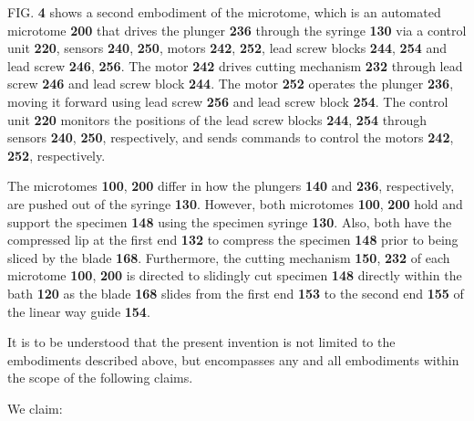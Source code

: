 \documentclass{article}
\begin{document}
FIG. \textbf{4} shows a second embodiment of the microtome, which is an automated microtome \textbf{200} that drives the plunger \textbf{236} through the syringe \textbf{130} via a control unit \textbf{220}, sensors \textbf{240}, \textbf{250}, motors \textbf{242}, \textbf{252}, lead screw blocks \textbf{244}, \textbf{254} and lead screw \textbf{246}, \textbf{256}. The motor \textbf{242} drives cutting mechanism \textbf{232} through lead screw \textbf{246} and lead screw block \textbf{244}. The motor \textbf{252} operates the plunger \textbf{236}, moving it forward using lead screw \textbf{256} and lead screw block \textbf{254}. The control unit \textbf{220} monitors the positions of the lead screw blocks \textbf{244}, \textbf{254} through sensors \textbf{240}, \textbf{250}, respectively, and sends commands to control the motors \textbf{242}, \textbf{252}, respectively.

The microtomes \textbf{100}, \textbf{200} differ in how the plungers \textbf{140} and \textbf{236}, respectively, are pushed out of the syringe \textbf{130}. However, both microtomes \textbf{100}, \textbf{200} hold and support the specimen \textbf{148} using the specimen syringe \textbf{130}. Also, both have the compressed lip at the first end \textbf{132} to compress the specimen \textbf{148} prior to being sliced by the blade \textbf{168}. Furthermore, the cutting mechanism \textbf{150}, \textbf{232} of each microtome \textbf{100}, \textbf{200} is directed to slidingly cut specimen \textbf{148}  directly within the bath \textbf{120} as the blade \textbf{168} slides from the first end \textbf{153} to the second end \textbf{155} of the linear way guide \textbf{154}.

It is to be understood that the present invention is not limited to the embodiments described above, but encompasses any and all embodiments within the scope of the following claims.

We claim:
\end{document}
